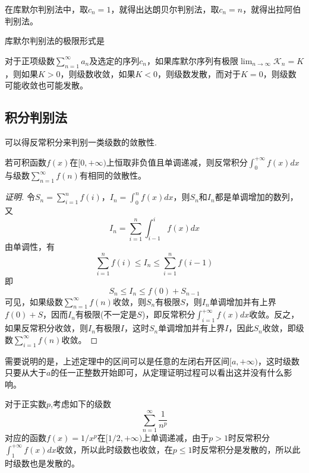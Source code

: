 在库默尔判别法中，取$c_n=1$，就得出达朗贝尔判别法，取$c_n=n$，就得出拉阿伯判别法。

库默尔判别法的极限形式是
\begin{theorem}
  对于正项级数$\sum_{n=1}^{\infty}a_n$及选定的序列$c_n$，如果库默尔序列有极限$\lim_{n \to \infty} \mathcal{K}_n=K$，则如果$K>0$，则级数收敛，如果$K<0$，则级数发散，而对于$K=0$，则级数可能收敛也可能发散。
\end{theorem}

\subsection{积分判别法}
\label{sec:the-integrate-method-of-determination-number-series}

可以得反常积分来判别一类级数的敛散性.
\begin{theorem}[积分判别法]
  若可积函数$f(x)$在$[0,+\infty)$上恒取非负值且单调递减，则反常积分$\int_0^{+\infty}f(x)dx$与级数$\sum_{n=1}^{\infty}f(n)$有相同的敛散性。
\end{theorem}

\begin{proof}[证明]
  令$S_n=\sum_{i=1}^nf(i)$，$I_n=\int_0^nf(x)dx$，则$S_n$和$I_n$都是单调增加的数列，又
  \[ I_n=\sum_{i=1}^n\int_{i-1}^if(x)dx \]
  由单调性，有
  \[ \sum_{i=1}^nf(i) \leqslant I_n \leqslant \sum_{i=1}^nf(i-1) \]
  即
  \[ S_n \leqslant I_n \leqslant f(0)+S_{n-1} \]
  可见，如果级数$\sum_{n=1}^{\infty}f(n)$收敛，则$S_n$有极限$S$，则$I_n$单调增加并有上界$f(0)+S$，因而$I_n$有极限(不一定是$S$)，即反常积分$\int_{i=1}^{+\infty}f(x)dx$收敛。反之，如果反常积分收敛，则$I_n$有极限$I$，这时$S_n$单调增加并有上界$I$，因此$S_n$收敛，即级数$\sum_{i=1}^{\infty}f(n)$收敛。
\end{proof}

需要说明的是，上述定理中的区间可以是任意的左闭右开区间$[a,+\infty)$，这时级数只要从大于$a$的任一正整数开始即可，从定理证明过程可以看出这并没有什么影响。

\begin{example}
  对于正实数$p$,考虑如下的级数
  \[ \sum_{n=1}^{\infty}\frac{1}{n^p} \]
  对应的函数$f(x)=1/x^p$在$[1/2,+\infty)$上单调递减，由于$p>1$时反常积分$\int_1^{+\infty}f(x)dx$收敛，所以此时级数也收敛，在$p \leqslant 1$时反常积分是发散的，所以此时级数也是发散的。
\end{example}



